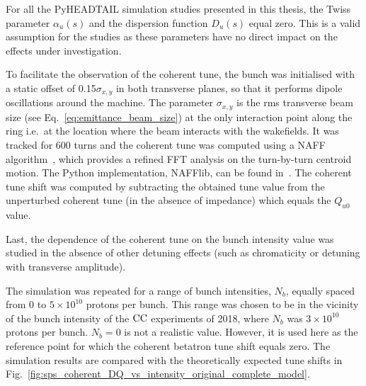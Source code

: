 For all the PyHEADTAIL simulation studies presented in this thesis, the Twiss parameter $\alpha_u(s)$ and the dispersion function $D_u(s)$ equal zero. This is a valid assumption for the studies as these parameters have no direct impact on the effects under investigation.

To facilitate the observation of the coherent tune, the bunch was initialised with a static offset of 0.15$\sigma_{x,y}$ in both transverse planes, so that it performs dipole oscillations around the machine. The parameter $\sigma_{x,y}$ is the rms transverse beam size (see Eq.~\eqref{eq:emittance_beam_size}) at the only interaction point along the ring i.e.~at the location where the beam interacts with the wakefields. It was tracked for 600 turns and the coherent tune was computed using a NAFF algorithm~\cite{LASKAR1990266, Kostoglou:2289645}, which provides a refined FFT analysis on the turn-by-turn centroid motion.  The Python implementation, NAFFlib, can be found in~\cite{nafflib_repository}. The coherent tune shift was computed by subtracting the obtained tune value from the unperturbed coherent tune (in the absence of impedance) which equals the $Q_{u0}$ value.

Last, the dependence of the coherent tune on the bunch intensity value was studied in the absence of other detuning effects (such as chromaticity or detuning with transverse amplitude). %

The simulation was repeated for a range of bunch intensities, $N_b$, equally spaced from 0 to $5 \times 10^{10}$ protons per bunch. This range was chosen to be in the vicinity of the bunch intensity of the ${\mathrm{CC}}$ experiments of 2018, where $N_b$ was $3\times 10^{10}$ protons per bunch. $N_b=0$ is not a realistic value. However, it is used here as the reference point for which the coherent betatron tune shift equals zero. The simulation results are compared with the theoretically expected tune shifts in Fig.~\ref{fig:sps_coherent_DQ_vs_intensity_original_complete_model}.

